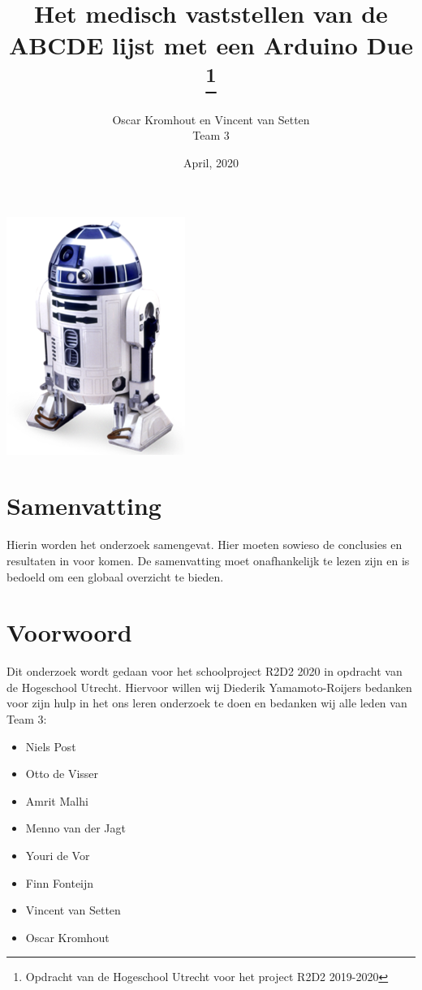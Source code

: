 \documentclass{article}
\title{Het medisch vaststellen van de ABCDE lijst met een Arduino Due \thanks{Opdracht van de Hogeschool Utrecht voor het project R2D2 2019-2020}}
\author{Oscar Kromhout en Vincent van Setten\\ Team 3}
\date{April, 2020}
\begin{document}
\begin{titlepage}
	\centering
	\maketitle
	\includegraphics[scale=2.0]{title.png}
	\clearpage
\end{titlepage}

\tableofcontents
\clearpage 
\section{Samenvatting}
Hierin worden het onderzoek samengevat. Hier moeten sowieso de conclusies en resultaten in voor komen. De samenvatting moet onafhankelijk te lezen zijn en is bedoeld om een globaal overzicht te bieden.

\section{Voorwoord}
Dit onderzoek wordt gedaan voor het schoolproject R2D2 2020 in opdracht van de Hogeschool Utrecht. Hiervoor willen wij Diederik Yamamoto-Roijers bedanken voor zijn hulp in het ons leren onderzoek te doen en bedanken wij alle leden van Team 3: 
\begin{itemize}
	\item Niels Post
	\item Otto de Visser
	\item Amrit Malhi
	\item Menno van der Jagt
	\item Youri de Vor
	\item Finn Fonteijn
	\item Vincent van Setten 
	\item Oscar Kromhout
\end{itemize}
\end{document}
